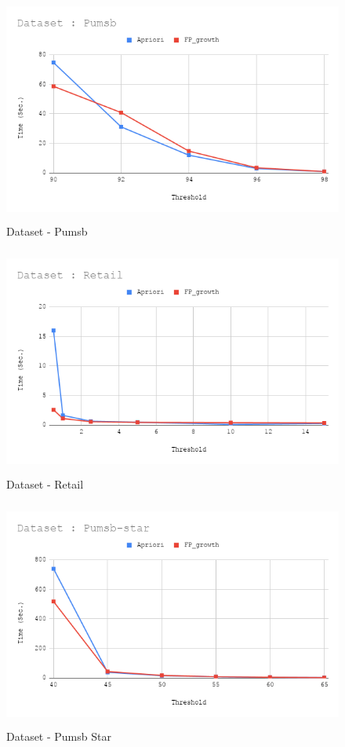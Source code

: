 \documentclass[12pt]{article}
\begin{document}
\begin{figure}[H]
	\centering
	\includegraphics[width = 0.95\columnwidth, height = 7.5cm]{Pumsb.png}
	\caption{Dataset - Pumsb}
	\label{fig:pumsb}
\end{figure}

\begin{figure}[H]
	\centering
	\includegraphics[width = 0.95\columnwidth, height = 7.5cm]{Retail.png}
	\caption{Dataset - Retail}
	\label{fig:retail}
\end{figure}

\begin{figure}[H]
	\centering
	\includegraphics[width = 0.95\columnwidth, height = 7.5cm]{Pumsb-star.png}
	\caption{Dataset - Pumsb Star}
	\label{fig:pbs}
\end{figure}
\end{document}
